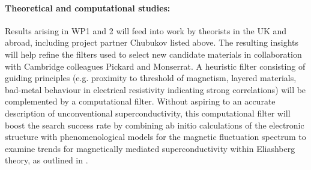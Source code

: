 \paragraph{Theoretical and computational studies:}
Results arising in WP1 and 2 will feed into work by theorists in the UK and abroad, including project partner Chubukov listed above. %
The resulting insights will help refine the filters used to select new candidate materials in collaboration with Cambridge colleagues Pickard and Monserrat. A heuristic filter consisting of guiding principles (e.g. proximity to threshold of magnetism, layered materials, bad-metal behaviour in electrical resistivity indicating strong correlations) will be complemented by a computational filter.
Without aspiring to an accurate description of unconventional superconductivity, this computational filter will boost the search success rate by combining ab initio calculations of the electronic structure with phenomenological models for the magnetic fluctuation spectrum to examine trends for magnetically mediated superconductivity within Eliashberg theory, as outlined  in \cite{monthoux07}.  




